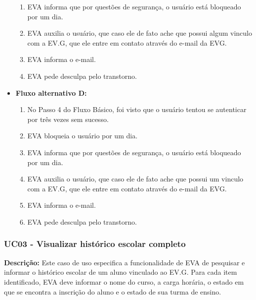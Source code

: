\begin{itemize}
\begin{enumerate}
            \item EVA informa que por questões de segurança, o usuário está bloqueado por um dia.
            \item EVA auxilia o usuário, que caso ele de fato ache que possui algum vinculo com a EV.G, que ele entre em contato através do e-mail da EVG.
            \item EVA informa o e-mail.
            \item EVA pede desculpa pelo transtorno.
        \end{enumerate}
    \item \textbf{Fluxo alternativo D:}
        \begin{enumerate}
            \item No Passo 4 do Fluxo Básico, foi visto que o usuário tentou se autenticar por três vezes sem sucesso.
            \item EVA bloqueia o usuário por um dia.
            \item EVA informa que por questões de segurança, o usuário está bloqueado por um dia.
            \item EVA auxilia o usuário, que caso ele de fato ache que possui um vinculo com a EV.G, que ele entre em contato através do e-mail da EVG.
            \item EVA informa o e-mail.
            \item EVA pede desculpa pelo transtorno.
        \end{enumerate}
\end{itemize}

\subsubsection{UC03 - Visualizar histórico escolar completo}
\textbf{Descrição:} Este caso de uso especifica a funcionalidade de EVA de pesquisar e informar o histórico escolar de um aluno vinculado ao EV.G. Para cada item identificado, EVA deve informar o nome do curso, a carga horária, o estado em que se encontra a inscrição do aluno e o estado de sua turma de ensino. 

